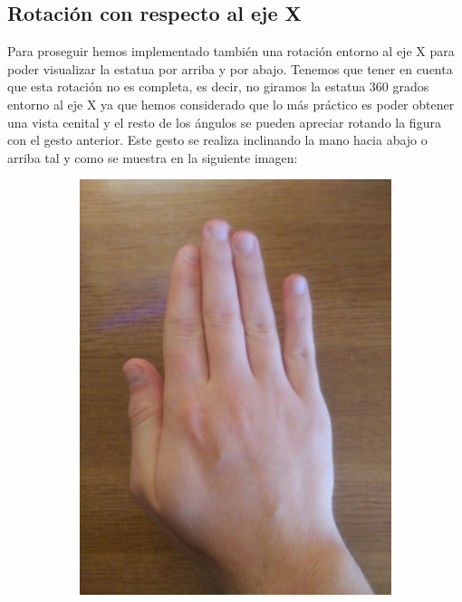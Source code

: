 \documentclass[a4paper,11pt]{article}
\begin{document}
\subsection{Rotación con respecto al eje X}

Para proseguir hemos implementado también una rotación entorno al eje X para poder visualizar la estatua por arriba y por abajo. Tenemos que tener en cuenta que esta rotación no es completa, es decir, no giramos la estatua 360 grados entorno al eje X ya que hemos considerado que lo más práctico es poder obtener una vista cenital y el resto de los ángulos se pueden apreciar rotando la figura con el gesto anterior. Este gesto se realiza inclinando la mano hacia abajo o arriba tal y como se muestra en la siguiente imagen:

\begin{figure}[!h]
	\centering
	\begin{subfigure}{0.32\textwidth}
		\centering
		\includegraphics[scale=0.044]{./Imagenes/normal.jpg}

\end{subfigure}
\end{figure}
\end{document}
